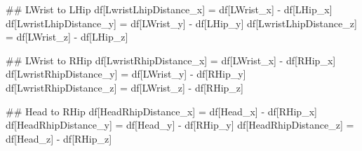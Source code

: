 \documentclass[
  letterpaper,
  DIV=11,
  numbers=noendperiod]{scrreprt}
\newenvironment{Shaded}{\begin{snugshade}}{\end{snugshade}}
\newcommand{\CommentTok}[1]{\textcolor[rgb]{0.37,0.37,0.37}{#1}}
\newcommand{\NormalTok}[1]{\textcolor[rgb]{0.00,0.23,0.31}{#1}}
\newcommand{\OperatorTok}[1]{\textcolor[rgb]{0.37,0.37,0.37}{#1}}
\newcommand{\StringTok}[1]{\textcolor[rgb]{0.13,0.47,0.30}{#1}}
\begin{document}
\begin{Shaded}
\begin{Highlighting}[]
    \CommentTok{\#\# LWrist to LHip}
\NormalTok{    df[}\StringTok{\textquotesingle{}LwristLhipDistance\_x\textquotesingle{}}\NormalTok{] }\OperatorTok{=}\NormalTok{ df[}\StringTok{\textquotesingle{}LWrist\_x\textquotesingle{}}\NormalTok{] }\OperatorTok{{-}}\NormalTok{ df[}\StringTok{\textquotesingle{}LHip\_x\textquotesingle{}}\NormalTok{]}
\NormalTok{    df[}\StringTok{\textquotesingle{}LwristLhipDistance\_y\textquotesingle{}}\NormalTok{] }\OperatorTok{=}\NormalTok{ df[}\StringTok{\textquotesingle{}LWrist\_y\textquotesingle{}}\NormalTok{] }\OperatorTok{{-}}\NormalTok{ df[}\StringTok{\textquotesingle{}LHip\_y\textquotesingle{}}\NormalTok{]}
\NormalTok{    df[}\StringTok{\textquotesingle{}LwristLhipDistance\_z\textquotesingle{}}\NormalTok{] }\OperatorTok{=}\NormalTok{ df[}\StringTok{\textquotesingle{}LWrist\_z\textquotesingle{}}\NormalTok{] }\OperatorTok{{-}}\NormalTok{ df[}\StringTok{\textquotesingle{}LHip\_z\textquotesingle{}}\NormalTok{]}

    \CommentTok{\#\# LWrist to RHip}
\NormalTok{    df[}\StringTok{\textquotesingle{}LwristRhipDistance\_x\textquotesingle{}}\NormalTok{] }\OperatorTok{=}\NormalTok{ df[}\StringTok{\textquotesingle{}LWrist\_x\textquotesingle{}}\NormalTok{] }\OperatorTok{{-}}\NormalTok{ df[}\StringTok{\textquotesingle{}RHip\_x\textquotesingle{}}\NormalTok{]}
\NormalTok{    df[}\StringTok{\textquotesingle{}LwristRhipDistance\_y\textquotesingle{}}\NormalTok{] }\OperatorTok{=}\NormalTok{ df[}\StringTok{\textquotesingle{}LWrist\_y\textquotesingle{}}\NormalTok{] }\OperatorTok{{-}}\NormalTok{ df[}\StringTok{\textquotesingle{}RHip\_y\textquotesingle{}}\NormalTok{]}
\NormalTok{    df[}\StringTok{\textquotesingle{}LwristRhipDistance\_z\textquotesingle{}}\NormalTok{] }\OperatorTok{=}\NormalTok{ df[}\StringTok{\textquotesingle{}LWrist\_z\textquotesingle{}}\NormalTok{] }\OperatorTok{{-}}\NormalTok{ df[}\StringTok{\textquotesingle{}RHip\_z\textquotesingle{}}\NormalTok{]}

    \CommentTok{\#\# Head to RHip}
\NormalTok{    df[}\StringTok{\textquotesingle{}HeadRhipDistance\_x\textquotesingle{}}\NormalTok{] }\OperatorTok{=}\NormalTok{ df[}\StringTok{\textquotesingle{}Head\_x\textquotesingle{}}\NormalTok{] }\OperatorTok{{-}}\NormalTok{ df[}\StringTok{\textquotesingle{}RHip\_x\textquotesingle{}}\NormalTok{]}
\NormalTok{    df[}\StringTok{\textquotesingle{}HeadRhipDistance\_y\textquotesingle{}}\NormalTok{] }\OperatorTok{=}\NormalTok{ df[}\StringTok{\textquotesingle{}Head\_y\textquotesingle{}}\NormalTok{] }\OperatorTok{{-}}\NormalTok{ df[}\StringTok{\textquotesingle{}RHip\_y\textquotesingle{}}\NormalTok{]}
\NormalTok{    df[}\StringTok{\textquotesingle{}HeadRhipDistance\_z\textquotesingle{}}\NormalTok{] }\OperatorTok{=}\NormalTok{ df[}\StringTok{\textquotesingle{}Head\_z\textquotesingle{}}\NormalTok{] }\OperatorTok{{-}}\NormalTok{ df[}\StringTok{\textquotesingle{}RHip\_z\textquotesingle{}}\NormalTok{]}


\end{Highlighting}
\end{Shaded}
\end{document}
